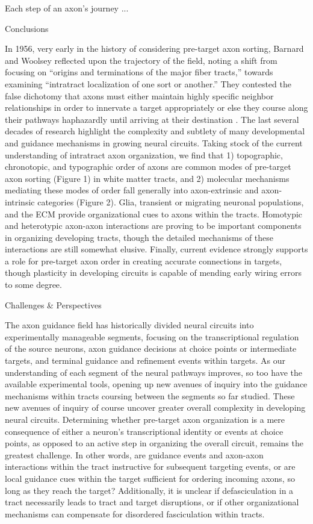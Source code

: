 Each step of an axon's journey ...

Conclusions

In 1956, very early in the history of considering pre-target axon sorting, Barnard and Woolsey reflected upon the trajectory of the field, noting a shift from focusing on “origins and terminations of the major fiber tracts,” towards examining “intratract localization of one sort or another.”
They contested the false dichotomy that axons must either maintain highly specific neighbor relationships in order to innervate a target appropriately or else they course along their pathways haphazardly until arriving at their destination \cite{barnard1956study}.
The last several decades of research highlight the complexity and subtlety of many developmental and guidance mechanisms in growing neural circuits.
Taking stock of the current understanding of intratract axon organization, we find that 1) topographic, chronotopic, and typographic order of axons are common modes of pre-target axon sorting (Figure 1) in white matter tracts, and 2) molecular mechanisms mediating these modes of order fall generally into axon-extrinsic and axon-intrinsic categories (Figure 2).
Glia, transient or migrating neuronal populations, and the ECM provide organizational cues to axons within the tracts.
Homotypic and heterotypic axon-axon interactions are proving to be important components in organizing developing tracts, though the detailed mechanisms of these interactions are still somewhat elusive.
Finally, current evidence strongly supports a role for pre-target axon order in creating accurate connections in targets, though plasticity in developing circuits is capable of mending early wiring errors to some degree.


Challenges \& Perspectives

The axon guidance field has historically divided neural circuits into experimentally manageable segments, focusing on the transcriptional regulation of the source neurons, axon guidance decisions at choice points or intermediate targets, and terminal guidance and refinement events within targets.
As our understanding of each segment of the neural pathways improves, so too have the available experimental tools, opening up new avenues of inquiry into the guidance mechanisms within tracts coursing between the segments so far studied.
These new avenues of inquiry of course uncover greater overall complexity in developing neural circuits.
Determining whether pre-target axon organization is a mere consequence of either a neuron’s transcriptional identity or events at choice points, as opposed to an active step in organizing the overall circuit, remains the greatest challenge.
In other words, are guidance events and axon-axon interactions within the tract instructive for subsequent targeting events, or are local guidance cues within the target sufficient for ordering incoming axons, so long as they reach the target?
Additionally, it is unclear if defasciculation in a tract necessarily leads to tract and target disruptions, or if other organizational mechanisms can compensate for disordered fasciculation within tracts.

